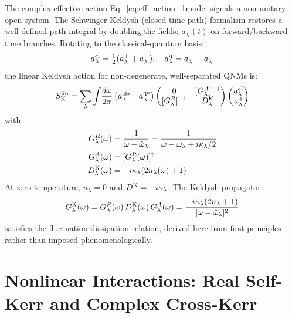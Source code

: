 \documentclass[12pt]{article}
\newcommand{\cl}{{\rm cl}}
\newcommand{\q}{{\rm q}}
\newcommand{\Keldysh}{{\rm K}}
\newcommand{\tomega}{\tilde{\omega}}
\begin{document}
The complex effective action Eq.~\eqref{eq:eff_action_1mode} signals a
non-unitary open system.  The Schwinger-Keldysh (closed-time-path)
formalism restores a well-defined path integral by doubling the fields:
$a_\lambda^\pm(t)$ on forward/backward time branches.  Rotating to the
classical-quantum basis:
\begin{equation}
  a_\lambda^\cl = \tfrac{1}{2}(a_\lambda^++a_\lambda^-),\quad
  a_\lambda^\q = a_\lambda^+-a_\lambda^-
  \label{eq:cq_rotation}
\end{equation}
the linear Keldysh action for non-degenerate, well-separated QNMs is:
\begin{equation}
  S_\Keldysh^{\rm lin} = \sum_\lambda\int\!\frac{d\omega}{2\pi}
  \begin{pmatrix}a_\lambda^{\cl*} & a_\lambda^{\q*}\end{pmatrix}
  \begin{pmatrix}0 & [G_\lambda^A]^{-1}\\
  [G_\lambda^R]^{-1} & D_\lambda^\Keldysh\end{pmatrix}
  \begin{pmatrix}a_\lambda^\cl\\a_\lambda^\q\end{pmatrix}
  \label{eq:SK_linear}
\end{equation}
with:
\begin{align}
  G_\lambda^R(\omega) &= \frac{1}{\omega-\tomega_\lambda}
  = \frac{1}{\omega-\omega_\lambda+i\kappa_\lambda/2}
  \label{eq:GR}\\
  G_\lambda^A(\omega) &= [G_\lambda^R(\omega)]^\dagger
  \label{eq:GA}\\
  D_\lambda^\Keldysh(\omega) &=
  -i\kappa_\lambda(2n_\lambda(\omega)+1)
  \label{eq:DK}
\end{align}
At zero temperature, $n_\lambda=0$ and $D^\Keldysh=-i\kappa_\lambda$.
The Keldysh propagator:
\begin{equation}
  G_\lambda^\Keldysh(\omega) =
  G_\lambda^R(\omega)\,D_\lambda^\Keldysh(\omega)\,G_\lambda^A(\omega)
  = \frac{-i\kappa_\lambda(2n_\lambda+1)}{|\omega-\tomega_\lambda|^2}
  \label{eq:GK}
\end{equation}
satisfies the fluctuation-dissipation relation, derived here from first
principles rather than imposed phenomenologically.

\section{Nonlinear Interactions: Real Self-Kerr and Complex Cross-Kerr}
\label{sec:nonlinear}
\end{document}
